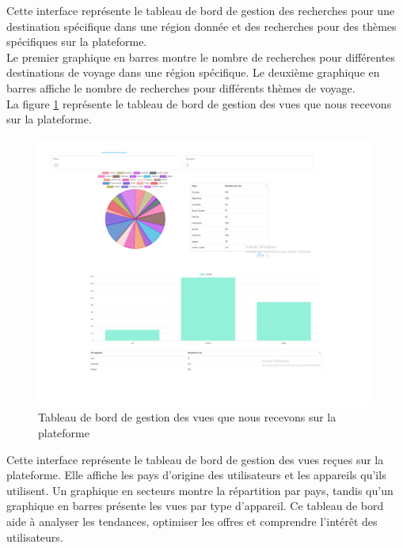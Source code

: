 \documentclass[12pt]{report}
\begin{document}
			Cette interface représente le tableau de bord de gestion des recherches pour une destination spécifique dans une région donnée et des recherches pour des thèmes spécifiques sur la plateforme.\\

			Le premier graphique en barres montre le nombre de recherches pour différentes destinations de voyage dans une région spécifique. Le deuxième graphique en barres affiche le nombre de recherches pour différents thèmes de voyage.\\

			La figure \ref{fig:dashboard5} représente le tableau de bord de gestion des vues que nous recevons sur la plateforme.

			\begin{figure}[h]
				\centering
				\includegraphics[width=\textwidth]{dashboard5.png}
				\caption{Tableau de bord de gestion des vues que nous recevons sur la plateforme}
				\label{fig:dashboard5}
			\end{figure}
			\FloatBarrier

			Cette interface représente le tableau de bord de gestion des vues reçues sur la plateforme. Elle affiche les pays d'origine des utilisateurs et les appareils qu'ils utilisent. Un graphique en secteurs montre la répartition par pays, tandis qu'un graphique en barres présente les vues par type d'appareil. Ce tableau de bord aide à analyser les tendances, optimiser les offres et comprendre l'intérêt des utilisateurs.\\
\end{document}
